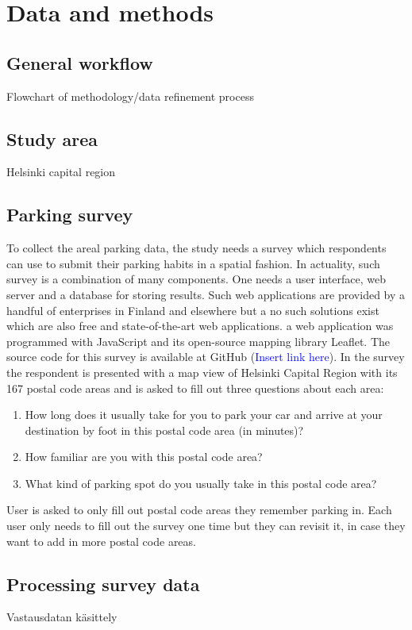 \section{Data and methods}
\subsection{General workflow}
\justify
Flowchart of methodology/data refinement process

\subsection{Study area}
\justify
Helsinki capital region

\subsection{Parking survey}
\justify
To collect the areal parking data, the study needs a survey which respondents can use to submit their parking habits in a spatial fashion. In actuality, such survey is a combination of many components. One needs a user interface, web server and a database for storing results. Such web applications are provided by a handful of enterprises in Finland and elsewhere but a no such solutions exist which are also free and state-of-the-art web applications. a web application was programmed with JavaScript and its open-source mapping library Leaflet. The source code for this survey is available at GitHub (\textcolor{blue}{Insert link here}). In the survey the respondent is presented with a map view of Helsinki Capital Region with its 167 postal code areas and is asked to fill out three questions about each area: 
\begin{spacing}{1}
\begin{enumerate}
  \item How long does it usually take for you to park your car and arrive at your destination by foot in this postal code area (in minutes)?
  \item How familiar are you with this postal code area?
  \item What kind of parking spot do you usually take in this postal code area?
\end{enumerate}
\end{spacing}

\noindent
User is asked to only fill out postal code areas they remember parking in. Each user only needs to fill out the survey one time but they can revisit it, in case they want to add in more postal code areas.

\subsection{Processing survey data}
\justify
Vastausdatan käsittely